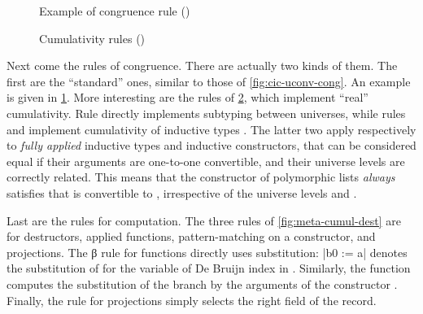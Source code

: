 \begin{figure}[ht]
  \ContinuedFloat
  \caption{Example of congruence rule ()}
  \label{fig:meta-cumul-cong}
\end{figure}

\begin{figure}[h]
  \ContinuedFloat
  \caption{Cumulativity rules ()}
  \label{fig:meta-cumul-cumul}
\end{figure}

Next come the rules of congruence. There are actually two kinds of them. The first are the
“standard” ones, similar to those of \cref{fig:cic-uconv-cong}. An example
is given in \cref{fig:meta-cumul-cong}.
More interesting are the rules of
\cref{fig:meta-cumul-cumul}, which implement “real” cumulativity. Rule  directly
implements subtyping between universes, while rules  and 
implement cumulativity of inductive types . The latter two apply respectively
to \emph{fully applied} inductive types and inductive constructors, that can be considered equal
if their arguments are one-to-one convertible, and their universe levels are correctly related.
This means that \eg the  constructor of polymorphic lists \emph{always} satisfies that
 is convertible to , irrespective of the universe levels 
and .

\begin{figure*}
  \ContinuedFloat
  \caption{Computation rules for destructors ()}
  \label{fig:meta-cumul-dest}
\end{figure*}

Last are the rules for computation.
The three rules of \cref{fig:meta-cumul-dest} are for destructors, \ie applied functions,
pattern-matching on a constructor, and projections. The β rule for functions directly uses
substitution: \coqe|b{0 := a}| denotes the substitution of  for the variable of De Bruijn
index  in . Similarly, the
 function computes the substitution of the branch  by the arguments
of the constructor .
Finally, the rule for projections simply selects the right field of the record.

